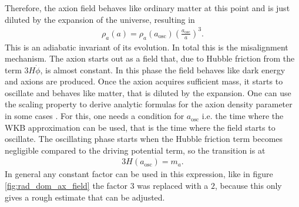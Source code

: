 \documentclass[twoside,a4paper, 12pt]{article}
\numberwithin{equation}{section}
\begin{document}
Therefore, the axion field behaves like ordinary matter at this point and
is just diluted by the expansion of the universe, resulting in \cite[Chap. 4.3.1, Page 28]{MarshAxionCosmo}
\begin{align}
    \label{eq:wkb_axion_denity}
    \rho_a(a) = \rho_a(a_\mathrm{osc}) \left( \frac{a_\mathrm{osc}}{a} \right)^3.
\end{align}
This is an adiabatic invariant of its evolution.
In total this is the misalignment mechanism. The axion starts out as a field that, due to Hubble friction from the term $3H\dot{\phi}$,
is almost constant. In this phase the field behaves like dark energy and axions are produced.
Once the axion acquires sufficient mass, it starts to oscillate and behaves like matter, that is diluted by the expansion.
One can use the scaling property to derive analytic formulas for the axion density parameter in some cases \cite[Chap 4.3.1, Page 28]{MarshAxionCosmo}.
For this, one needs a condition for $a_\mathrm{osc}$ i.e. the time where the WKB approximation can be used, that is the time where the field starts to
oscillate.
The oscillating phase starts when the Hubble friction term becomes negligible compared to the driving potential term,
so the transition is at
\begin{align}
    \label{eq:a_osc_cond}
    3 H(a_\mathrm{osc}) = m_a.
\end{align}
In general any constant factor can be used in this expression, like in figure \ref{fig:rad_dom_ax_field} the factor  $3$
was replaced with a $2$, because this only gives a rough estimate that can be adjusted.
\end{document}
